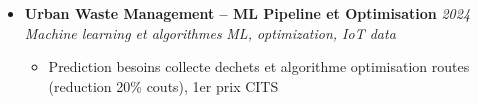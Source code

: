 \documentclass[a4paper,11pt]{article}
\begin{document}
\begin{itemize}[leftmargin=*, label={-}]
\item \textbf{Urban Waste Management -- ML Pipeline et Optimisation} \hfill \textit{2024} \\
\textit{Machine learning et algorithmes} \hfill \textit{ML, optimization, IoT data}
\vspace{-2pt}
    \begin{itemize}[leftmargin=0.4cm, nosep, label=\tiny$\bullet$]
        \item \small{Prediction besoins collecte dechets et algorithme optimisation routes (reduction 20\% couts), 1er prix CITS}
    \end{itemize}

\end{itemize}
\end{document}
